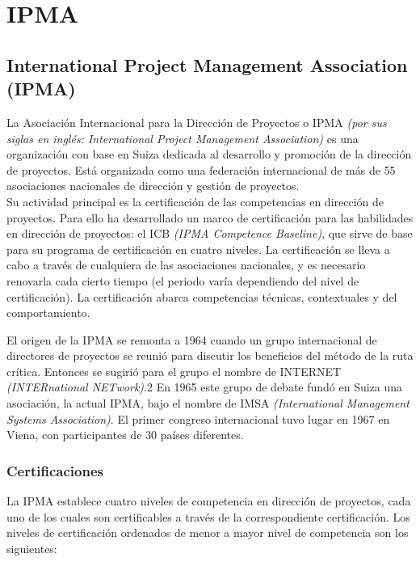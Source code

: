 \section{IPMA}

\subsection{International Project Management Association (IPMA)}

La Asociación Internacional para la Dirección de Proyectos o IPMA \emph{(por sus siglas en inglés: International Project Management Association)} es una organización con base en Suiza dedicada al desarrollo y promoción de la dirección de proyectos. Está organizada como una federación internacional de más de 55 asociaciones nacionales de dirección y gestión de proyectos.\\

Su actividad principal es la certificación de las competencias en dirección de proyectos. Para ello ha desarrollado un marco de certificación para las habilidades en dirección de proyectos: el ICB \emph{(IPMA Competence Baseline)}, que sirve de base para su programa de certificación en cuatro niveles. La certificación se lleva a cabo a través de cualquiera de las asociaciones nacionales, y es necesario renovarla cada cierto tiempo (el periodo varía dependiendo del nivel de certificación). La certificación abarca competencias técnicas, contextuales y del comportamiento.

El origen de la IPMA se remonta a 1964 cuando un grupo internacional de directores de proyectos se reunió para discutir los beneficios del método de la ruta crítica. Entonces se sugirió para el grupo el nombre de INTERNET \emph{(INTERnational NETwork)}.2 En 1965 este grupo de debate fundó en Suiza una asociación, la actual IPMA, bajo el nombre de IMSA \emph{(International Management Systems Association)}. El primer congreso internacional tuvo lugar en 1967 en Viena, con participantes de 30 países diferentes.

\subsubsection{Certificaciones}

La IPMA establece cuatro niveles de competencia en dirección de proyectos, cada uno de los cuales son certificables a través de la correspondiente certificación. Los niveles de certificación ordenados de menor a mayor nivel de competencia son los siguientes:\\

